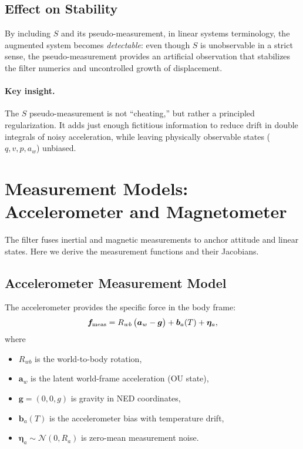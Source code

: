 \documentclass[10pt]{extarticle}
\begin{document}
\subsection{Effect on Stability}
By including $S$ and its pseudo-measurement, in linear systems terminology, the augmented
system becomes \emph{detectable}: even though $S$ is unobservable in a strict sense, the 
pseudo-measurement provides an artificial observation that stabilizes the filter numerics and
uncontrolled growth of displacement.

\paragraph{Key insight.} 
The $S$ pseudo-measurement is not “cheating,” but rather a principled
regularization. It adds just enough fictitious information to reduce drift in double integrals of noisy acceleration, 
while leaving physically observable states ($q,v,p,a_w$) unbiased.

\section{Measurement Models: Accelerometer and Magnetometer}
\label{sec:meas-models}

The filter fuses inertial and magnetic measurements to anchor attitude and
linear states. Here we derive the measurement functions and their Jacobians.

\subsection{Accelerometer Measurement Model}
The accelerometer provides the specific force in the body frame:
\begin{equation}
\bm f_{\rm meas} 
= R_{wb}\,\big(\bm a_w - \bm g\big) + \bm b_a(T) + \bm\eta_a,
\label{eq:accel-meas}
\end{equation}
where
\begin{itemize}
\item $R_{wb}$ is the world-to-body rotation,
\item $\bm a_w$ is the latent world-frame acceleration (OU state),
\item $\bm g = (0,0,g)$ is gravity in NED coordinates,
\item $\bm b_a(T)$ is the accelerometer bias with temperature drift,
\item $\bm\eta_a \sim \mathcal{N}(0,R_a)$ is zero-mean measurement noise.
\end{itemize}
\end{document}
